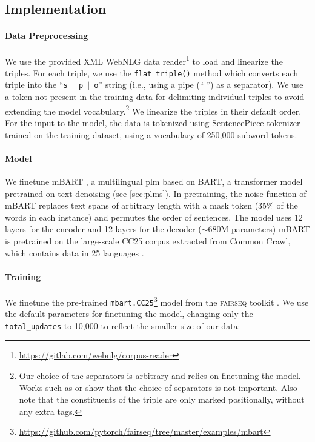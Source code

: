 % 


\subsection{Implementation}
\paragraph{Data Preprocessing} We use the provided XML WebNLG data reader\footnote{\url{https://gitlab.com/webnlg/corpus-reader}} to load and linearize the triples. For each triple, we use the \texttt{flat\_triple()} method which converts each triple into the ``\texttt{s $\vert$ p $\vert$ o}'' string (i.e., using a pipe (``$\vert$'') as a separator). We use a token not present in the training data for delimiting individual triples to avoid extending the model vocabulary.\footnote{Our choice of the separators is arbitrary and relies on finetuning the model. Works such as or  show that the choice of separators is not important. Also note that the constituents of the triple are only marked positionally, without any extra tags.} We linearize the triples in their default order. For the input to the model, the data is tokenized using SentencePiece tokenizer \citep{kudo2018sentencepiece} trained on the training dataset, using a vocabulary of 250,000 subword tokens.

\paragraph{Model}
We finetune mBART \cite{liuMultilingualDenoisingPretraining2020}, a multilingual \ac{plm} based on BART, a transformer model pretrained on text denoising (see \autoref{sec:plms}).  In pretraining, the noise function of mBART replaces text spans of arbitrary length with a mask token (35\% of the words in each instance) and permutes the order of sentences. The model uses 12 layers for the encoder and 12 layers for the decoder ($\sim$680M parameters)  mBART is pretrained on the large-scale CC25 corpus extracted from Common Crawl, which contains data in 25 languages \citep{wenzek2020ccnet}.



\paragraph{Training} We finetune the pre-trained \texttt{mbart.CC25}\footnote{\url{https://github.com/pytorch/fairseq/tree/master/examples/mbart}} model from the \textsc{fairseq} toolkit \citep{ott2019fairseq}. We use the default parameters for finetuning the model, changing only the \texttt{total\_updates} to 10,000 to reflect the smaller size of our data:




